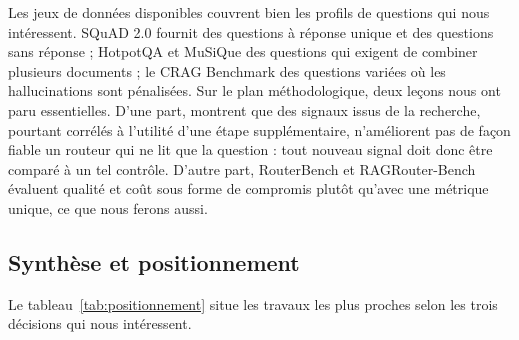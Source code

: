 \documentclass[11pt,a4paper]{article}
\begin{document}
Les jeux de données disponibles couvrent bien les profils de questions qui nous intéressent. SQuAD 2.0
\citep{rajpurkar2018squad2} fournit des questions à réponse unique et des questions sans réponse ;
HotpotQA \citep{yang2018hotpotqa} et MuSiQue \citep{trivedi2022musique} des questions qui exigent de
combiner plusieurs documents ; le CRAG Benchmark \citep{yang2024cragbench} des questions variées où les
hallucinations sont pénalisées. Sur le plan méthodologique, deux leçons nous ont paru essentielles.
D'une part, \citet{li2026beyond} montrent que des signaux issus de la recherche, pourtant corrélés à
l'utilité d'une étape supplémentaire, n'améliorent pas de façon fiable un routeur qui ne lit que la
question : tout nouveau signal doit donc être comparé à un tel contrôle. D'autre part, RouterBench et
RAGRouter-Bench évaluent qualité et coût sous forme de compromis plutôt qu'avec une métrique unique, ce
que nous ferons aussi.

\subsection{Synthèse et positionnement}

Le tableau~\ref{tab:positionnement} situe les travaux les plus proches selon les trois décisions qui
nous intéressent.
\end{document}
